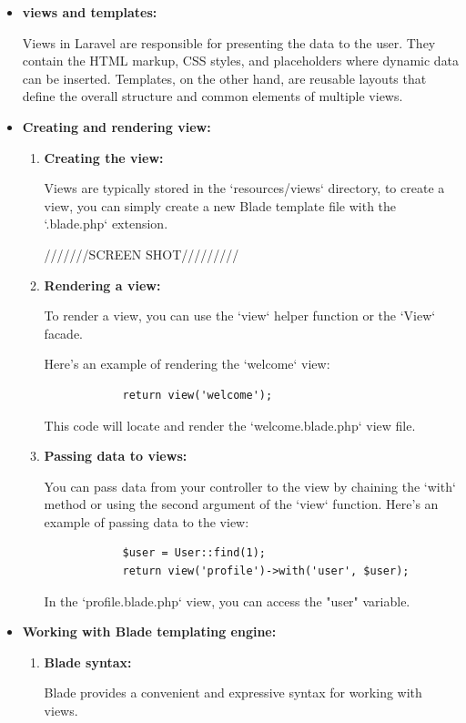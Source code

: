 \begin{itemize}
    \item \textbf{views and templates:}
    
    Views in Laravel are responsible for presenting the data to the user. They contain the HTML markup, CSS styles, and placeholders where dynamic data can be inserted. Templates, on the other hand, are reusable layouts that define the overall structure and common elements of multiple views.
    \item \textbf{Creating and rendering view:}
    \begin{enumerate}
        \item \textbf{Creating the view:}
        
        Views are typically stored in the `resources/views` directory, to create a view, you can simply create a new Blade template file with the `.blade.php` extension.

        ///////SCREEN SHOT/////////
        \item \textbf{Rendering a view:}
        
        To render a view, you can use the `view` helper function or the `View` facade.
        
        Here's an example of rendering the `welcome` view:
        \begin{verbatim}
            return view('welcome');
        \end{verbatim}
        This code will locate and render the `welcome.blade.php` view file.
        \item \textbf{Passing data to views:}
        
        You can pass data from your controller to the view by chaining the `with` method or using the second argument of the `view` function.
        Here's an example of passing data to the view:
        \begin{verbatim}
            $user = User::find(1);
            return view('profile')->with('user', $user);
        \end{verbatim}
        In the `profile.blade.php` view, you can access the "user" variable.
     \end{enumerate}
     \item \textbf{Working with Blade templating engine:}
     \begin{enumerate}
        \item \textbf{Blade syntax:}
        
        Blade provides a convenient and expressive syntax for working with views.
        

\end{enumerate}
\end{itemize}
